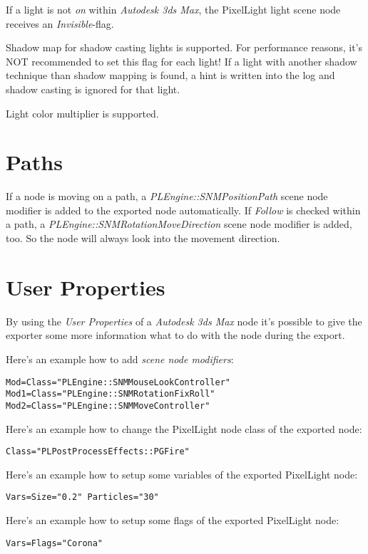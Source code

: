 If a light is not \emph{on} within \emph{Autodesk 3ds Max}, the PixelLight light scene node receives an \emph{Invisible}-flag.

Shadow map for shadow casting lights is supported. For performance reasons, it's NOT recommended to set this flag for each light! If a light with another shadow technique than shadow mapping is found, a hint is written into the log and shadow casting is ignored for that light.

Light color multiplier is supported.




\section{Paths}
If a node is moving on a path, a \emph{PLEngine::SNMPositionPath} scene node modifier is added to the exported node automatically. If \emph{Follow} is checked within a path, a \emph{PLEngine::SNMRotationMoveDirection} scene node modifier is added, too. So the node will always look into the movement direction.





\section{User Properties}
By using the \emph{User Properties} of a \emph{Autodesk 3ds Max} node it's possible to give the exporter some more information what to do with the node during the export.

Here's an example how to add \emph{scene node modifiers}:

\begin{lstlisting}[caption=Multiple scene node modifiers]
Mod=Class="PLEngine::SNMMouseLookController"
Mod1=Class="PLEngine::SNMRotationFixRoll"
Mod2=Class="PLEngine::SNMMoveController"
\end{lstlisting}

Here's an example how to change the PixelLight node class of the exported node:

\begin{lstlisting}[caption=Setting the scene node class]
Class="PLPostProcessEffects::PGFire"
\end{lstlisting}

Here's an example how to setup some variables of the exported PixelLight node:

\begin{lstlisting}[caption=Setting scene node variables]
Vars=Size="0.2" Particles="30"
\end{lstlisting}

Here's an example how to setup some flags of the exported PixelLight node:

\begin{lstlisting}[caption=Setting scene node flags]
Vars=Flags="Corona"
\end{lstlisting}
